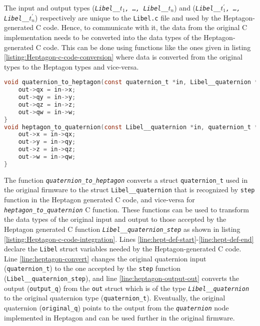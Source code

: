 \documentclass[10pt, a4paper]{article}
\newcommand{\textFunc}[1]{\texttt{\textit{#1}}}
\newcommand{\code}[1]{\texttt{#1}}
\begin{document}
    The input and output types (\textFunc{Libel\_\_$t_1$, \dots, Libel\_\_$t_n$}) and (\textFunc{Libel\_\_$t_1^{'}$, \dots, Libel\_\_$t_n^{'}$}) respectively are unique to the \code{Libel.c} file and used by the Heptagon-generated C code. Hence, to communicate with it, the data from the original C implementation needs to be converted into the data types of the Heptagon-generated C code. This can be done using functions like the ones given in listing \ref{listing:Heptagon-c-code-conversion} where data is converted from the original types to the Heptagon types and vice-versa.

    \bigskip
    \begin{lstlisting}[caption={C functions to convert Heptagon C code into original code and vice-versa}, label={listing:Heptagon-c-code-conversion}, language=C]
void quaternion_to_heptagon(const quaternion_t *in, Libel__quaternion *out) {
    out->qx = in->x;
    out->qy = in->y;
    out->qz = in->z;
    out->qw = in->w;
}
void heptagon_to_quaternion(const Libel__quaternion *in, quaternion_t *out) {
    out->x = in->qx;
    out->y = in->qy;
    out->z = in->qz;
    out->w = in->qw;
}   \end{lstlisting}
    \bigskip

    The function \textFunc{quaternion\_to\_heptagon} converts a struct \code{quaternion\_t} used in the original firmware to the struct \code{Libel\_\_quaternion} that is recognized by \code{step} function in the Heptagon generated C code, and vice-versa for \textFunc{heptagon\_to\_quaternion} C function. These functions can be used to transform the data types of the original input and output to those accepted by the Heptagon generated C function  \textFunc{Libel\_\_quaternion\_step} as shown in listing \ref{listing:Heptagon-c-code-integration}. Lines \ref{line:hept-def-start}-\ref{line:hept-def-end} declare the \code{Libel} struct variables needed by the Heptagon-generated C code. Line \ref{line:heptagon-convert} changes the original quaternion input (\code{quaternion\_t}) to the one accepted by the \code{step} function (\code{Libel\_\_quaternion\_step}), and line \ref{line:heptagon-output-out} converts the output (\code{output\_q}) from the \code{out} struct which is of the type \textFunc{Libel\_\_quaternion} to the original quaternion type (\code{quaternion\_t}). Eventually, the original quaternion (\code{original\_q}) points to the output from the \textFunc{quaternion} node implemented in Heptagon and can be used further in the original firmware.
\end{document}
